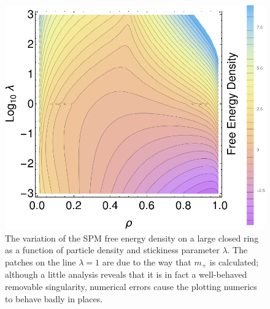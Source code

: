 \begin{figure}[h!]
 \caption[The free energy density of the SPM on a closed ring, as a function of density
 and $\lambda$.]{\label{fig:spmFreeEnergy} 
 The variation of the SPM free energy density on a large closed ring as a function of particle 
 density and stickiness parameter $\lambda$. The patches on the line $\lambda=1$ are
 due to the way that $m_+$ is calculated; although a little analysis reveals that it is in fact a
 well-behaved removable singularity, numerical errors cause the plotting numerics to behave
 badly in places.
 }
  \begin{center}
 \includegraphics[width=1.0\textwidth]{analytics/images/spmFreeEnergy}
  \end{center}
\end{figure}

